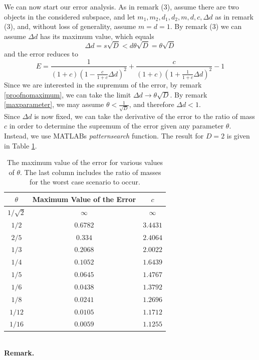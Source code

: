 We can now start our error analysis.
As in remark (3), assume there are two objects in the considered subspace, and let $m_1,m_2,d_1,d_2,m,d,c,\Delta d$ as in remark (3), and, without loss of generality, assume $m = d = 1$. By remark (3) we can assume $\Delta d$ has its maximum value, which equals
\[
\Delta d = s\sqrt{D} < d\theta \sqrt{D} = \theta\sqrt{D}
\]
and the error reduces to
\[
E = \frac{1}{(1+c)(1-\frac{c}{1+c}\Delta d)^2}+\frac{c}{(1+c)(1+\frac{1}{1+c}\Delta d)^2}-1
\]
Since we are interested in the supremum of the error, by remark \ref{proofnomaximum}, we can take the limit $\Delta d \rightarrow \theta \sqrt{D}$. By remark \ref{maxparameter}, we may assume $\theta < \frac{1}{\sqrt{D}}$, and therefore $\Delta d<1$.\\
Since $\Delta d$ is now fixed, we can take the derivative of the error to the ratio of mass $c$ in order to determine the supremum of the error given any parameter $\theta$. Instead, we use MATLABs \textit{patternsearch} function. The result for $D=2$ is given in Table \ref{tab:maxerror}.
\begin{table}[h!]
\centering
\caption{The maximum value of the error for various values of $\theta$. The last column includes the ratio of masses for the worst case scenario to occur.}
\label{tab:maxerror}
\begin{tabular}{c|c|c}
$\theta$ & Maximum Value of the Error & $c$\\
\hline
$1/\sqrt{2}$ & $\infty$ & $\infty$\\
$1/2$ & $0.6782$ & $3.4431$\\
$2/5$ & $0.334$ & $2.4064$\\
$1/3$ & $0.2068$ & $2.0022$\\
$1/4$ & $0.1052$ & $1.6439$\\
$1/5$ & $0.0645$ & $1.4767$\\
$1/6$ & $0.0438$ & $1.3792$\\
$1/8$ & $0.0241$ & $1.2696$\\
$1/12$ & $0.0105$ & $1.1712$\\
$1/16$ & $0.0059$ & $1.1255$ 
\end{tabular}
\end{table}\\
\textbf{Remark.}
